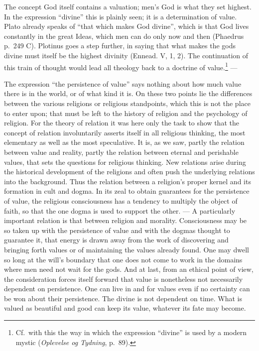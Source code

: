 \documentclass[12pt]{article}
\newcommand{\opage}[1]{\marginnote{\footnotesize\textit{[#1]}}}
\begin{document}
The concept God itself contains a valuation; men's God is what they set
highest. In the expression ``divine'' this is plainly seen; it is a
determination of value. Plato already speaks of ``that which makes God
divine'', which is that God lives constantly in the great Ideas, which men
can do only now and then (Phaedrus p.~249 C). Plotinus goes a step further,
in saying that what makes the gods divine must itself be the highest
divinity (Ennead. V, 1, 2). The continuation of this train of thought would
lead all theology back to a doctrine of value.\footnote{Cf.\ with this the
way in which the expression ``divine'' is used by a modern mystic
(\textit{Oplevelse og Tydning}, p.~89).} ---

The expression ``the persistence of value'' says nothing about how much
value there is in the world, or of what kind it is. On these two points lie
the differences between the \opage{98}various religions or religious standpoints,
which this is not the place to enter upon; that must be left to the history
of religion and the psychology of religion. For the theory of relation it
was here only the task to show that the concept of relation involuntarily
asserts itself in all religious thinking, the most elementary as well as the
most speculative. It is, as we saw, partly the relation between value and
reality, partly the relation between eternal and perishable values, that
sets the questions for religious thinking. New relations arise during the
historical development of the religions and often push the underlying
relations into the background. Thus the relation between a religion's proper
kernel and its formation in cult and dogma. In its zeal to obtain guarantees
for the persistence of value, the religious consciousness has a tendency to
multiply the object of faith, so that the one dogma is used to support the
other. --- A particularly important relation is that between religion and
morality. Consciousness may be so taken up with the persistence of value and
with the dogmas thought to guarantee it, that energy is drawn away from the
work of discovering and bringing forth values or of maintaining the values
already found. One may dwell so long at the will's boundary that one does
not come to work in the domains where men need not wait for the gods. And at
last, from an ethical point of view, the consideration forces itself forward
that value is nonetheless not necessarily dependent on persistence. One can
live in and for values even if no certainty can be won about their
persistence. The divine is not dependent on time. What is valued as beautiful
and good can keep its value, whatever its fate may become.
\end{document}
